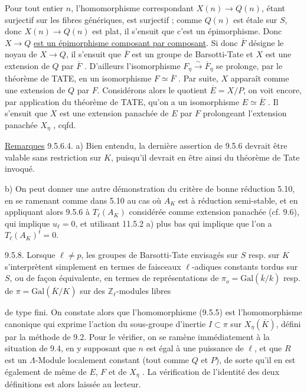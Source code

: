
Pour tout entier $n$, l'homomorphisme correspondant $X(n) \longrightarrow Q(n)$, étant surjectif sur les fibres génériques, est surjectif ; comme $Q(n)$ est étale sur $S$, donc $X(n) \longrightarrow Q(n)$ est plat, il s'ensuit que c'est un épimorphisme. Donc $X \longrightarrow Q$ \underline{est un épimorphisme composant par composant}. Si donc $\overline{F}$ désigne le noyau de $X \longrightarrow Q$, il s'ensuit que $\overline{F}$ est un groupe de Barsotti-Tate et $X$ est une extension de $Q$ par $\overline{F}$ . D'ailleurs l'isomorphisme $F_\eta \xrightarrow{\sim} \overline{F}_\eta$ se prolonge, par le théorème de TATE, en un isomorphisme $F \simeq \overline{F}$ . Par suite, $X$ apparaît comme une extension de $Q$ par $F$. Considérons alors le quotient $\overline{E} = X/P$, on voit encore, par application du théorème de TATE, qu'on a un isomorphisme $E \simeq \overline{E}$ . Il s'ensuit que $X$ est une extension panachée de $E$ par $F$ prolongeant l'extension panachée $X_\eta$ , cqfd.

\underline{Remarques} 9.5.6.4.  a)  Bien entendu, la dernière assertion de 9.5.6 devrait être valable sans restriction sur $K$, puisqu'il devrait en être ainsi du théorème de Tate invoqué.

b)  On peut donner une autre démonstration du critère de bonne réduction 5.10, en se ramenant comme dans 5.10 au cas où $A_K$ est à réduction semi-stable, et en appliquant alors 9.5.6 à $T_\ell(A_K)$ considérée comme extension panachée (cf. 9.6), qui implique $u_\ell = 0$, et utilisant 11.5.2 a) plus bas qui implique que l'on a $T_\ell(A_K)^t = 0$.

9.5.8.  Lorsque $\ell \neq p$, les groupes de Barsotti-Tate envisagés sur $S$ resp. sur $K$ s'interprètent simplement en termes de faisceaux $\ell$-adiques constants tordus sur $S$, ou de façon équivalente, en termes de représentations de $\pi_o = \mathrm{Gal}(\overline{k}/k)$ resp. de $\pi = \mathrm{Gal}(\overline{K}/K)$ sur des $\mathbb{Z}_\ell$-modules libres



de type fini. On constate alors que l'homomorphisme (9.5.5) est l'homomorphisme canonique qui exprime l'action du sous-groupe d'inertie $I \subset \pi$ sur $X_\eta(\overline{K})$, défini par la méthode de 9.2. Pour le vérifier, on se ramène immédiatement à la situation de 9.4, en y supposant  que $n$ est égal à une puissance de $\ell$, et que $R$ est un $\Lambda$-Module localement constant (tout comme $Q$ et $P$), de sorte qu'il en est également de même de $E$, $F$ et de $X_\eta$ . La vérification de l'identité des deux définitions est alors laissée au lecteur.

